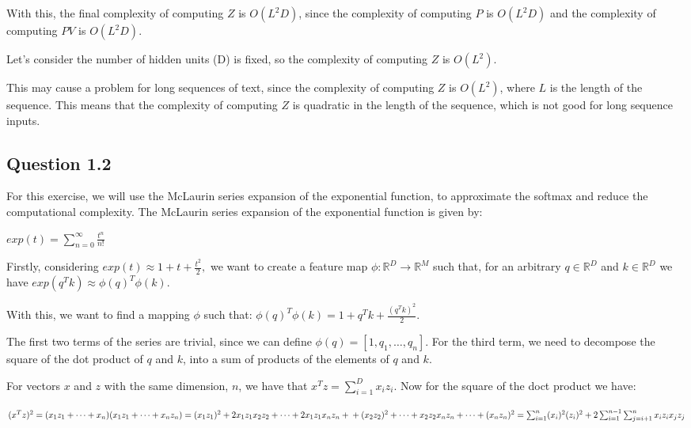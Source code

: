 \documentclass{article}
\begin{document}
With this, the final complexity of computing $Z$ is $O(L^2D)$, since the complexity of computing $P$ is $O(L^2D)$ 
and the complexity of computing $PV$ is $O(L^2D)$.

\bigskip

Let's consider the number of hidden units (D) is fixed, so the complexity of computing $Z$ is $O(L^2)$.

This may cause a problem for long sequences of text, since the complexity of computing $Z$ is $O(L^2)$, where $L$ is the length of the sequence.
This means that the complexity of computing $Z$ is quadratic in the length of the sequence, which is not good for long sequence inputs.

\subsection{Question 1.2}

For this exercise, we will use the McLaurin series expansion of the exponential function, to approximate the softmax and reduce the computational 
complexity. The McLaurin series expansion of the exponential function is given by:

\bigskip

$exp(t) = \sum_{n=0}^{\infty} \frac{t^n}{n!}$

\bigskip

Firstly, considering $exp(t) \approx 1 + t + \frac{t^2}{2}, $ we want to create a feature map $\phi: \mathbb{R}^D \rightarrow \mathbb{R}^M$ such that, 
for an arbitrary $q \in \mathbb{R}^D$ and $k \in \mathbb{R}^D$ we have $exp(q^Tk) \approx \phi(q)^T \phi(k)$.

With this, we want to find a mapping $\phi$ such that:
$ \phi(q)^T \phi(k) = 1 + q^Tk + \frac{(q^Tk)^2}{2}$.

\bigskip

The first two terms of the series are trivial, since we can define $\phi(q) = [1, q_1, \dots, q_n]$. 
For the third term, we need to decompose the square of the dot product of $q$ and $k$, into a sum of products of the elements of $q$ and $k$.

For vectors $x$ and $z$ with the same dimension, $n$, we have that $x^Tz = \sum_{i=1}^{D} x_iz_i$.
Now for the square of the doct product we have:

\medskip

$ (x^Tz)^2 = (x_1z_1 + \dots + x_n)(x_1z_1 + \dots + x_nz_n) = (x_1z_1)^2 + 2x_1z_1x_2z_2 + \dots + 2x_1z_1x_nz_n + \\
+ (x_2z_2)^2 + \dots + x_2z_2x_nz_n + \dots + (x_nz_n)^2 = \sum_{i=1}^n (x_i)^2(z_i)^2 + 2\sum_{i=1}^{n-1} \sum_{j=i+1}^{n} x_iz_ix_jz_j \\
$
\end{document}
